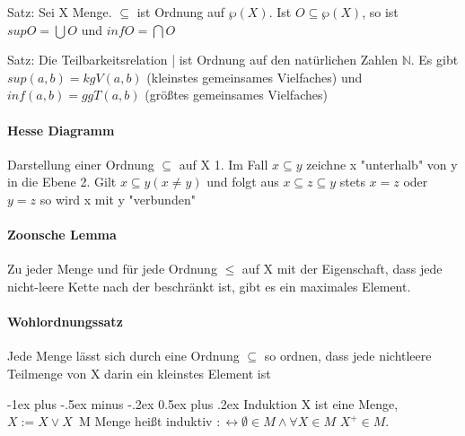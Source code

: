 \documentclass[10pt,landscape]{article}
\makeatletter
\renewcommand{\section}{\@startsection{section}{1}{0mm}%
                                {-1ex plus -.5ex minus -.2ex}%
                                {0.5ex plus .2ex}%
                                {\normalfont\large\bfseries}}
\makeatother
\begin{document}
\begin{multicols}{3}
Satz: Sei X Menge. $\subseteq$ ist Ordnung auf $\wp(X)$. Ist $O\subseteq \wp(X)$, so ist $sup O=\bigcup O$ und $inf O=\bigcap O$

Satz: Die Teilbarkeitsrelation | ist Ordnung auf den natürlichen Zahlen $\mathbb{N}$. Es gibt $sup(a,b)=kgV(a,b)$ (kleinstes gemeinsames Vielfaches) und $inf(a,b)=ggT(a,b)$ (größtes gemeinsames Vielfaches)

\paragraph{Hesse Diagramm}
Darstellung einer Ordnung $\subseteq$ auf X
1. Im Fall $x\subseteq y$ zeichne x "unterhalb" von y in die Ebene
2. Gilt $x\subseteq y (x\not = y)$ und folgt aus $x \subseteq z \subseteq y$ stets $x=z$ oder $y=z$ so wird x mit y "verbunden"

\paragraph{Zoonsche Lemma}
Zu jeder Menge und für jede Ordnung $\leq$ auf X mit der Eigenschaft, dass jede nicht-leere Kette nach der beschränkt ist, gibt es ein maximales Element.

\paragraph{Wohlordnungssatz}
Jede Menge lässt sich durch eine Ordnung $\subseteq$ so ordnen, dass jede nichtleere Teilmenge von X darin ein kleinstes Element ist











\section{Induktion}
X ist eine Menge, $X:=X\vee {X}$\
M Menge heißt induktiv $:\leftrightarrow \emptyset \in M \wedge \forall X \in M$  $X^+ \in M$.


\end{multicols}
\end{document}
